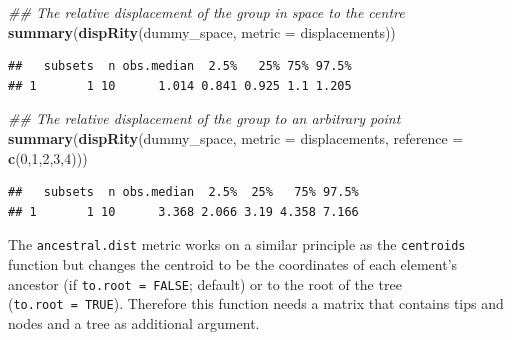 \documentclass[
]{book}
\newenvironment{Shaded}{\begin{snugshade}}{\end{snugshade}}
\newcommand{\CommentTok}[1]{\textcolor[rgb]{0.56,0.35,0.01}{\textit{#1}}}
\newcommand{\DataTypeTok}[1]{\textcolor[rgb]{0.13,0.29,0.53}{#1}}
\newcommand{\DecValTok}[1]{\textcolor[rgb]{0.00,0.00,0.81}{#1}}
\newcommand{\KeywordTok}[1]{\textcolor[rgb]{0.13,0.29,0.53}{\textbf{#1}}}
\newcommand{\NormalTok}[1]{#1}
\begin{document}
\begin{Shaded}
\begin{Highlighting}[]
\CommentTok{\#\# The relative displacement of the group in space to the centre}
\KeywordTok{summary}\NormalTok{(}\KeywordTok{dispRity}\NormalTok{(dummy\_space, }\DataTypeTok{metric =}\NormalTok{ displacements))}
\end{Highlighting}
\end{Shaded}

\begin{verbatim}
##   subsets  n obs.median  2.5%   25% 75% 97.5%
## 1       1 10      1.014 0.841 0.925 1.1 1.205
\end{verbatim}

\begin{Shaded}
\begin{Highlighting}[]
\CommentTok{\#\# The relative displacement of the group to an arbitrary point}
\KeywordTok{summary}\NormalTok{(}\KeywordTok{dispRity}\NormalTok{(dummy\_space, }\DataTypeTok{metric =}\NormalTok{ displacements,}
                 \DataTypeTok{reference =} \KeywordTok{c}\NormalTok{(}\DecValTok{0}\NormalTok{,}\DecValTok{1}\NormalTok{,}\DecValTok{2}\NormalTok{,}\DecValTok{3}\NormalTok{,}\DecValTok{4}\NormalTok{)))}
\end{Highlighting}
\end{Shaded}

\begin{verbatim}
##   subsets  n obs.median  2.5%  25%   75% 97.5%
## 1       1 10      3.368 2.066 3.19 4.358 7.166
\end{verbatim}

The \texttt{ancestral.dist} metric works on a similar principle as the \texttt{centroids} function but changes the centroid to be the coordinates of each element's ancestor (if \texttt{to.root\ =\ FALSE}; default) or to the root of the tree (\texttt{to.root\ =\ TRUE}).
Therefore this function needs a matrix that contains tips and nodes and a tree as additional argument.
\end{document}
